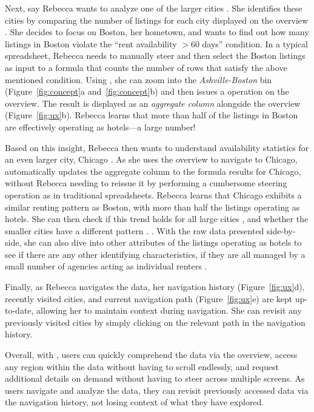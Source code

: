 Next, say Rebecca wants to analyze
one of the larger cities .
She identifies these cities by
comparing the number of listings
for each city displayed on the overview .
She decides to focus on Boston, her hometown,
and wants to find out how many listings
in Boston violate
the ``rent availability $>60$ days'' condition.
In a typical spreadsheet, Rebecca needs to manually steer and then select
the Boston listings as input to a  formula that counts the number of
rows that satisfy the above mentioned condition.
Using \noah, she can zoom into
the {\em Ashville-Boston} bin
(Figure~\ref{fig:concept}a and~\ref{fig:concept}b)
and then issues
a  operation on the overview.
The result is displayed as an {\em aggregate column}
alongside the overview (Figure~\ref{fig:ux}b).
Rebecca learns  that more than half of the listings in Boston are 
effectively operating as hotels---a large number! 

Based on this insight, Rebecca then wants to
understand availability statistics for an even
larger city, Chicago .
As she uses the overview to navigate
to Chicago, \noah
automatically updates the aggregate column to
the  formula results for Chicago,
without Rebecca needing to reissue it by performing a cumbersome steering operation as in traditional spreadsheets. 
Rebecca learns that Chicago exhibits 
a similar renting pattern as Boston, with more than half the listings operating as hotels. She can then check if this trend holds for all large cities ,
and whether the smaller cities have a different pattern . . With the raw 
data presented side-by-side, she can also dive into other attributes
of the listings operating as hotels to see if there are any other identifying characteristics,
\eg if they are all managed by a small number of agencies acting as individual renters .

 Finally, as Rebecca navigates the data,
 her navigation history (Figure~\ref{fig:ux}d),
 \ie recently visited cities, and current navigation path
 (Figure~\ref{fig:ux}e) are kept up-to-date,
 allowing her to maintain context during navigation.
 She can revisit any previously visited cities
 by simply clicking on the relevant path
 in the navigation history.


Overall, with \noah, users can quickly
comprehend the data via the overview, access any region 
within the data without having to
scroll endlessly, and request additional details on demand without having to
steer across multiple screens. As users navigate and analyze the data, 
they can revisit previously accessed data via the navigation history, not losing context
of what they have explored. 





